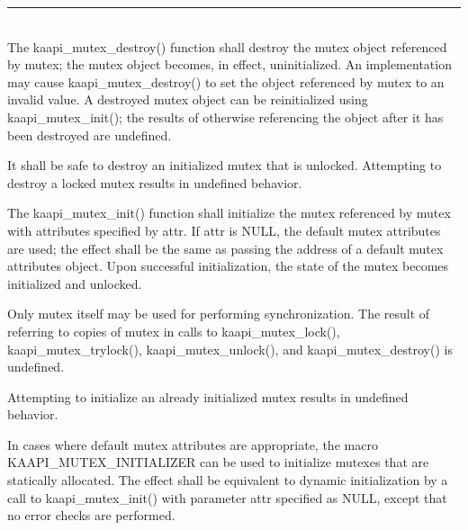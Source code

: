

\begin{description}
\vspace*{3ex} \hrule width 4cm
\item [\texttt{int kaapi\_mutex\_init (kaapi\_mutex\_t *\_\_restrict mutex,
    const kaapi\_mutexattr\_t *\_\_restrict attr)}]
\item [\texttt{int kaapi\_mutex\_destroy (kaapi\_mutex\_t *mutex)}]~\\

The kaapi\_mutex\_destroy() function shall destroy the mutex object referenced
by mutex; the mutex object becomes, in effect, uninitialized. An
implementation may cause kaapi\_mutex\_destroy() to set the object referenced
by mutex to an invalid value. A destroyed mutex object can be reinitialized
using kaapi\_mutex\_init(); the results of otherwise referencing the object
after it has been destroyed are undefined.

It shall be safe to destroy an initialized mutex that is unlocked. Attempting
to destroy a locked mutex results in undefined behavior.

The kaapi\_mutex\_init() function shall initialize the mutex referenced by
mutex with attributes specified by attr. If attr is NULL, the default mutex
attributes are used; the effect shall be the same as passing the address of a
default mutex attributes object. Upon successful initialization, the state of
the mutex becomes initialized and unlocked.

Only mutex itself may be used for performing synchronization. The result of
referring to copies of mutex in calls to kaapi\_mutex\_lock(),
kaapi\_mutex\_trylock(), kaapi\_mutex\_unlock(), and kaapi\_mutex\_destroy()
is undefined.

Attempting to initialize an already initialized mutex results in undefined
behavior.

In cases where default mutex attributes are appropriate, the macro
KAAPI\_MUTEX\_INITIALIZER can be used to initialize mutexes that are
statically allocated. The effect shall be equivalent to dynamic initialization
by a call to kaapi\_mutex\_init() with parameter attr specified as NULL,
except that no error checks are performed.


\end{description}
